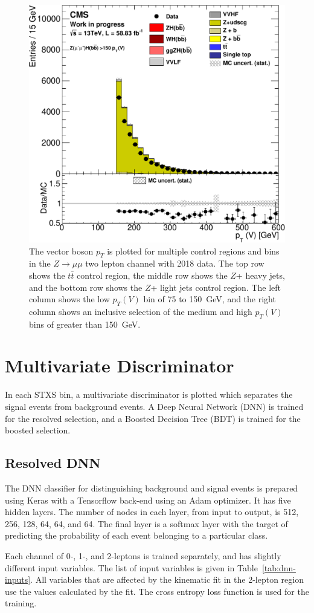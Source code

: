 \begin{figure}
  \includegraphics[width=0.42\linewidth]{figures/2018_Zmm/Zlf_medhigh_Zmm__Vpt_.pdf}
  \caption[Control region plots for two muons in 2018]{
    The vector boson $p_T$ is plotted for multiple control regions and bins in
    the $Z\rightarrow \mu\mu$ two lepton channel with 2018 data.
    The top row shows the $t\bar{t}$ control region,
    the middle row shows the $Z$+ heavy jets,
    and the bottom row shows the $Z$+ light jets control region.
    The left column shows the low $p_T(V)$ bin of 75 to \SI{150}{GeV},
    and the right column shows an inclusive selection of
    the medium and high $p_T(V)$ bins of greater than \SI{150}{GeV}.
  }
  \label{fig:2018_Zmm_vpt}
\end{figure}

\section{Multivariate Discriminator}

In each STXS bin, a multivariate discriminator is plotted which separates
the signal events from background events.
A Deep Neural Network (DNN) is trained for the resolved selection,
and a Boosted Decision Tree (BDT) is trained for the boosted selection.

\subsection{Resolved DNN}

The DNN classifier for distinguishing background and signal events is prepared using
Keras with a Tensorflow back-end using an Adam optimizer.
It has five hidden layers.
The number of nodes in each layer, from input to output, is 512, 256, 128, 64, 64, and 64.
The final layer is a softmax layer with the target of predicting the probability
of each event belonging to a particular class.

Each channel of 0-, 1-, and 2-leptons is trained separately,
and has slightly different input variables.
The list of input variables is given in Table~\ref{tab:dnn-inputs}.
All variables that are affected by the kinematic fit in the 2-lepton region
use the values calculated by the fit.
The cross entropy loss function is used for the training.


